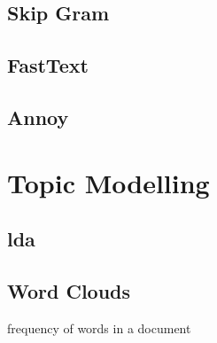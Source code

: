 \subsection{Skip Gram}\label{subsec:skip-gram}

\subsection{FastText}\label{subsec:fasttext}

\subsection{Annoy}\label{subsec:glove}


\section{Topic Modelling}\label{sec:topic-modelling}

\subsection{\ac{lda}}\label{subsec:latent-dirichlet-allocation}

\subsection{Word Clouds}\label{subsec:word-clouds}
frequency of words in a document

